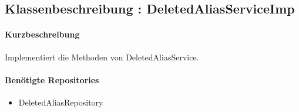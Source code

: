 \subsection{Klassenbeschreibung : DeletedAliasServiceImp}%
\paragraph*{Kurzbeschreibung}
Implementiert die Methoden von DeletedAliasService.
\paragraph*{Benötigte Repositories}
\begin{itemize}
    \item DeletedAliasRepository
\end{itemize}